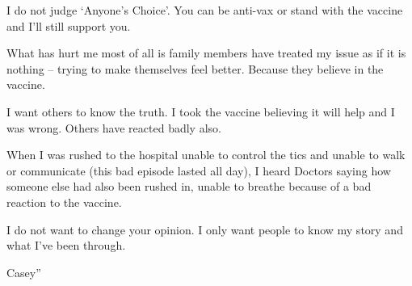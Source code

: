 I do not judge ‘Anyone’s Choice’. You can be anti-vax or stand with the vaccine
and I’ll still support you.

What has hurt me most of all is family members have treated my issue as if it is
nothing – trying to make themselves feel better. Because they believe in the
vaccine.

I want others to know the truth. I took the vaccine believing it will help and I
was wrong. Others have reacted badly also.

When I was rushed to the hospital unable to control the tics and unable to walk
or communicate (this bad episode lasted all day), I heard Doctors saying how
someone else had also been rushed in, unable to breathe because of a bad
reaction to the vaccine.

I do not want to change your opinion. I only want people to know my story and
what I’ve been through.

Casey”
